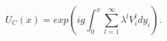 \begin{equation}
U_C(x)= exp\left( ig\int_0^x\sum_{l=1}^{\infty}\lambda^l V_i^l dy_i\right).
\end{equation}


